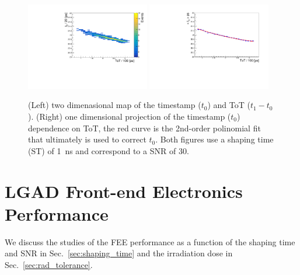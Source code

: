 \documentclass[preprint,1p]{elsarticle}
\begin{document}
\begin{figure}[htbp]
  \centering
  \includegraphics[width=0.48\textwidth]{figs/twoD_ToT_pre_rad_st_1ns_snr_30_le_tot_threshold_30mV_v2.pdf} \hfill
  \includegraphics[width=0.48\textwidth]{figs/oneD_ToT_pre_rad_st_1ns_snr_30_le_tot_threshold_30mV_v2.pdf}
  \caption{(Left) two dimenasional map of the timestamp ($t_{0}$) and ToT ($t_{1} - t_{0}$).
  (Right) one dimensional projection of the timestamp ($t_{0}$) dependence on ToT, the red curve is the 2nd-order polinomial fit that
  ultimately is used to correct $t_{0}$. Both figures use a shaping time (ST) of 1~\si{ns} and correspond to a SNR of 30.}
  \label{fig:ToT}
\end{figure}




\section{LGAD Front-end Electronics Performance}\label{sec:results}

We discuss the studies of the FEE performance as a function of 
the shaping time and SNR in Sec.~\ref{sec:shaping_time} and 
the irradiation dose in Sec.~\ref{sec:rad_tolerance}.
\end{document}
